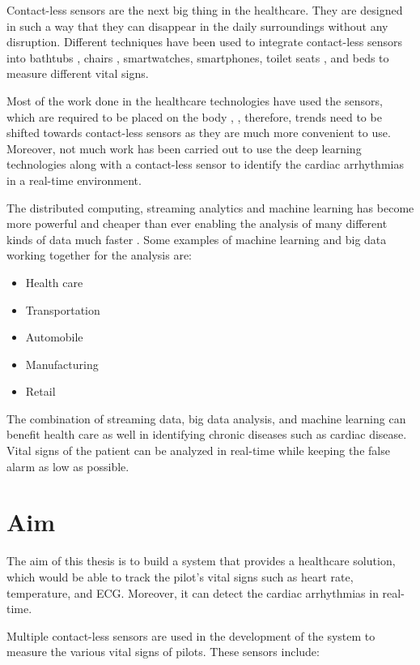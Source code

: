 Contact-less sensors are the next big thing in the healthcare. They are designed in such a way that they can disappear in the daily surroundings without any disruption. Different techniques have been used to integrate contact-less sensors into bathtubs \cite{lim2004ecg}, chairs \cite{aleksandrowicz2007wireless}, smartwatches, smartphones, toilet seats \cite{kim2004electrically}, and beds \cite{wu2008contactless} to measure different vital signs.

Most of the work done in the healthcare technologies have used the sensors, which are required to be placed on the body \cite{shen2007detection}, \cite{neuman1998biopotential}, therefore, trends need to be shifted towards contact-less sensors as they are much more convenient to use. Moreover, not much work has been carried out to use the deep learning technologies along with a contact-less sensor to identify the cardiac arrhythmias in a real-time environment. 


The distributed computing, streaming analytics and machine learning has become more powerful and cheaper than ever enabling the analysis of many different kinds of data much faster \cite{maprmliotmed}. Some examples of machine learning and big data working together for the analysis are:

\begin{itemize}
	\item Health care
	\item Transportation
	\item Automobile
	\item Manufacturing
	\item Retail
\end{itemize}


The combination of streaming data, big data analysis, and machine learning can benefit health care as well in identifying chronic diseases such as cardiac disease. Vital signs of the patient can be analyzed in real-time while keeping the false alarm as low as possible.

\section{Aim}

The aim of this thesis is to build a system that provides a healthcare solution, which would be able to track the pilot's vital signs such as heart rate, temperature, and ECG. Moreover, it can detect the cardiac arrhythmias in real-time.

Multiple contact-less sensors are used in the development of the system to measure the various vital signs of pilots. These sensors include:

